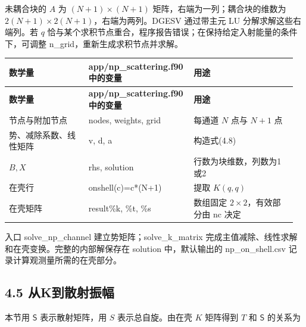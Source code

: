 \documentclass[UTF8,a4paper,zihao=5,fontset=fandol]{ctexart}
\begin{document}
未耦合块的 \(A\) 为 \((N+1)\times(N+1)\) 矩阵，右端为一列；耦合块的维数为 \(2(N+1)\times2(N+1)\)，右端为两列。{\ttfamily\small DGESV} 通过带主元 LU 分解求解这些右端列。若 \(q\) 恰与某个求积节点重合，程序报告错误；在保持给定入射能量的条件下，可调整 {\ttfamily\small n\_\allowbreak{}grid}，重新生成求积节点并求解。


{\small\setlength{\tabcolsep}{3pt}\renewcommand{\arraystretch}{1.28}
\begin{longtable}{@{}>{\raggedright\arraybackslash}p{0.2784\linewidth}>{\raggedright\arraybackslash}p{0.3264\linewidth}>{\raggedright\arraybackslash}p{0.3552\linewidth}@{}}\toprule
\textbf{数学量} & \textbf{{\ttfamily\small app/\allowbreak{}np\_\allowbreak{}scattering.\allowbreak{}f90} 中的变量} & \textbf{用途}\\\midrule
\endfirsthead
\textbf{数学量} & \textbf{{\ttfamily\small app/\allowbreak{}np\_\allowbreak{}scattering.\allowbreak{}f90} 中的变量} & \textbf{用途}\\\midrule
\endhead
节点与附加节点 & {\ttfamily\small nodes}, {\ttfamily\small weights}, {\ttfamily\small grid} & 每通道 \(N\) 点与 \(N+1\) 点\\
势、减除系数、线性矩阵 & {\ttfamily\small v}, {\ttfamily\small d}, {\ttfamily\small a} & 构造式(4.8)\\
\(B,X\) & {\ttfamily\small rhs}, {\ttfamily\small solution} & 行数为块维数，列数为1或2\\
在壳行 & {\ttfamily\small onshell(c)=\allowbreak{}c*(N+1)} & 提取 \(K(q,q)\)\\
在壳矩阵 & {\ttfamily\small result\%k}, {\ttfamily\small \%t}, {\ttfamily\small \%s} & 数组固定 \(2\times2\)，有效部分由 {\ttfamily\small nc} 决定\\
\bottomrule\end{longtable}}
入口 {\ttfamily\small solve\_\allowbreak{}np\_\allowbreak{}channel} 建立势矩阵；{\ttfamily\small solve\_\allowbreak{}k\_\allowbreak{}matrix} 完成主值减除、线性求解和在壳变换。完整的内部解保存在 {\ttfamily\small solution} 中，默认输出的 {\ttfamily\small np\_\allowbreak{}on\_\allowbreak{}shell.\allowbreak{}csv} 记录计算观测量所需的在壳部分。

\subsection*{4.5 从K到散射振幅}
本节用 \(\mathsf S\) 表示散射矩阵，用 \(S\) 表示总自旋。由在壳 \(K\) 矩阵得到 \(T\) 和 \(\mathsf S\) 的关系为
\end{document}

